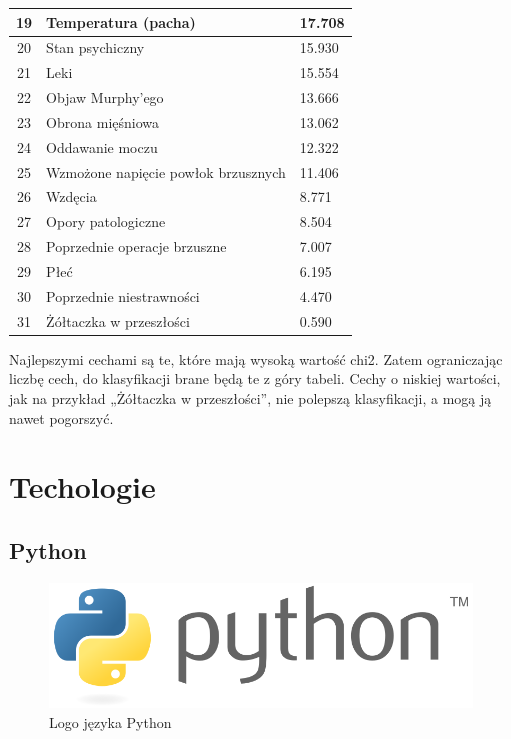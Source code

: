 \begin{longtable}{|c|l|l|}
        \hline 19 & Temperatura (pacha) & 17.708 \\
        \hline 20 & Stan psychiczny & 15.930 \\
        \hline 21 & Leki & 15.554 \\
        \hline 22 & Objaw Murphy'ego & 13.666 \\
        \hline 23 & Obrona mięśniowa & 13.062 \\
        \hline 24 & Oddawanie moczu & 12.322 \\
        \hline 25 & Wzmożone napięcie powłok brzusznych & 11.406 \\
        \hline 26 & Wzdęcia & 8.771 \\
        \hline 27 & Opory patologiczne & 8.504 \\
        \hline 28 & Poprzednie operacje brzuszne & 7.007 \\
        \hline 29 & Płeć & 6.195 \\
        \hline 30 & Poprzednie niestrawności & 4.470 \\
        \hline 31 & Żółtaczka w przeszłości & 0.590 \\
    \end{longtable}

    \vspace{1em}

    Najlepszymi cechami są te, które mają wysoką wartość chi2.
    Zatem ograniczając liczbę cech, do klasyfikacji brane będą te z góry tabeli.
    Cechy o niskiej wartości, jak na przykład „Żółtaczka w przeszłości”, nie polepszą klasyfikacji, a mogą ją nawet pogorszyć.

    \chapter{Techologie}\label{ch:techologie}

    \section{Python}\label{sec:python}

    \begin{figure}[htp]
        \centering
        \includegraphics[scale=0.4]{./img/python-logo.png}
        \caption{Logo języka Python}
    \end{figure}

